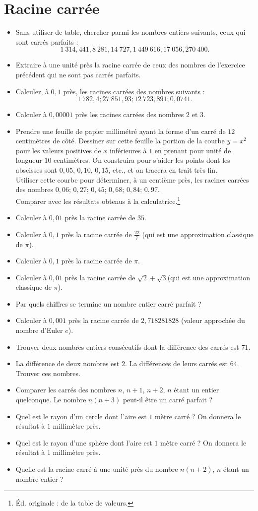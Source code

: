 \documentclass[12 pt]{report}
\theoremstyle{plain}
\newcounter{n}
\renewcommand{\it}{\item[$\mathbf{\then}.$]\stepcounter{n} }
\begin{document}
 \chapter{Racine carrée}
 \begin{itemize}
 \it Sans utiliser de table, chercher parmi les nombres entiers suivants, ceux qui sont carrés parfaits : 
 \[ 1~314, 441, 8~281, 14~727, 1~449~616, 17~056, 270~400.\]
 \it Extraire à une unité près la racine carrée de ceux des nombres de l'exercice précédent qui ne sont pas carrés parfaits. 
 \it Calculer, à $0,1$ près, les racines carrées des nombres suivants : 
 \[ 1~782,4; 27~851,93; 12~723,891; 0,0741.\]
 \it Calculer à $0,00001$ près les racines carrées des nombres $2$ et $3$. 
 \it Prendre une feuille de papier millimétré ayant la forme d'un carré de $12$ centimètres de côté. Dessiner sur cette feuille la portion de la courbe $y=x^2$ pour les valeurs positives de $x$ inférieures à $1$ en prenant pour unité de longueur $10$ centimètres. On construira pour s'aider les points dont les abscisses sont $0,05$, $0,10$, $0,15$, etc., et on tracera en trait très fin. \\ 
 Utiliser cette courbe pour déterminer, à un centième près, les racines carrées des nombres $0,06$; $0,27$; $0,45$; $0,68$; $0,84$; $0,97$. \\
 Comparer avec les résultats obtenus à la calculatrice.\footnote{Éd. originale : de la table de valeurs.} 
 \it Calculer à $0,01$ près la racine carrée de $35$.
 \it Calculer à $0,1$ près la racine carrée de $\frac{22}7$ (qui est une approximation classique de $\pi$).
 \it Calculer à $0,1$ près la racine carrée de $\pi$.
 \it Calculer à $0,01$ près la racine carrée de $\sqrt2+\sqrt3$(qui est une approximation classique de $\pi$).
 \it Par quels chiffres se termine un nombre entier carré parfait ? 
 \it Calculer à $0,001$ près la racine carrée de $2,718281828$ (valeur approchée du nombre d'Euler $e$).
 \it Trouver deux nombres entiers consécutifs dont la différence des carrés est $71$.
 \it La différence de deux nombres est $2$. La différences de leurs
 carrés est $64$. Trouver ces nombres. 
 \it Comparer les carrés des nombres $n$, $n+1$, $n+2$, $n$ étant 
 un entier quelconque. Le nombre $n(n+3)$ peut-il être un carré parfait ? 
 \it Quel est le rayon d'un cercle dont l'aire est $1$ mètre carré ? On  donnera le résultat à $1$ millimètre près. 
 \it Quel est le rayon d'une sphère dont l'aire est $1$ mètre carré ? 
 On donnera le résultat à $1$ millimètre près.
 \it Quelle est la racine carré à une unité près du nombre $n(n+2)$, $n$ étant un nombre entier ? 

\end{itemize}
\end{document}
